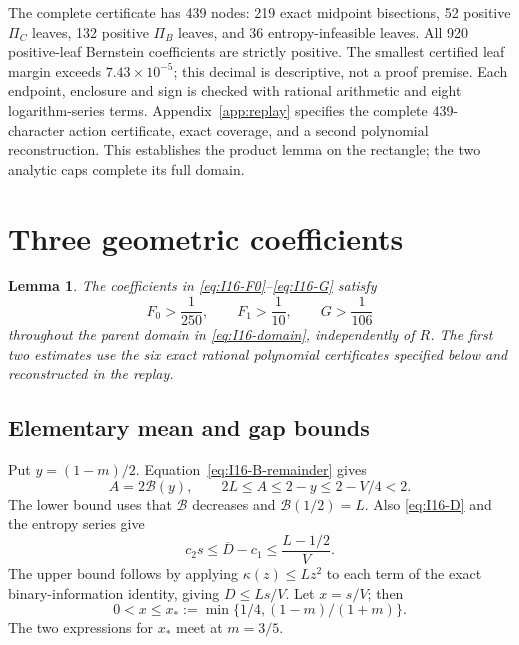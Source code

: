 \documentclass[11pt]{article}
\newtheorem{lemma}[theorem]{Lemma}
\theoremstyle{remark}\newtheorem{remark}[theorem]{Remark}
\numberwithin{equation}{section}
\begin{document}
The complete certificate has 439 nodes: 219 exact midpoint bisections,
52 positive $\Pi_C$ leaves, 132 positive $\Pi_B$ leaves, and 36
entropy-infeasible leaves. All 920 positive-leaf Bernstein coefficients
are strictly positive. The smallest certified leaf margin exceeds
$7.43\times10^{-5}$; this decimal is descriptive, not a proof premise.
Each endpoint, enclosure and sign is checked with rational arithmetic and
eight logarithm-series terms. Appendix~\ref{app:replay} specifies the complete
439-character action certificate, exact coverage, and a second polynomial
reconstruction. This establishes the product lemma on the rectangle; the two
analytic caps complete its full domain.

\section{Three geometric coefficients}\label{sec:geometry}
\begin{lemma}\label{lem:I16-geometry}
The coefficients in \eqref{eq:I16-F0}--\eqref{eq:I16-G} satisfy
\begin{equation}\label{eq:I16-geometry}
 F_0>\frac1{250},\qquad F_1>\frac1{10},\qquad G>\frac1{106}
\end{equation}
throughout the parent domain in \eqref{eq:I16-domain}, independently of $R$.
The first two estimates use the six exact rational polynomial certificates
specified below and reconstructed in the replay.
\end{lemma}

\subsection{Elementary mean and gap bounds}
Put $y=(1-m)/2$. Equation~\eqref{eq:I16-B-remainder} gives
\begin{equation}\label{eq:I16-A-bounds}
 A=2\mathcal B(y),\qquad 2L\le A\le2-y\le2-V/4<2.
\end{equation}
The lower bound uses that $\mathcal B$ decreases and
$\mathcal B(1/2)=L$. Also \eqref{eq:I16-D} and the entropy series give
\begin{equation}\label{eq:I16-D-bounds}
 c_2s\le\overline D-c_1\le\frac{L-1/2}{V}.
\end{equation}
The upper bound follows by applying $\kappa(z)\le Lz^2$ to each term of
the exact binary-information identity, giving $D\le Ls/V$.
Let $x=s/V$; then
\[
 0<x\le x_*:=\min\{1/4,(1-m)/(1+m)\}.
\]
The two expressions for $x_*$ meet at $m=3/5$.
\end{document}
